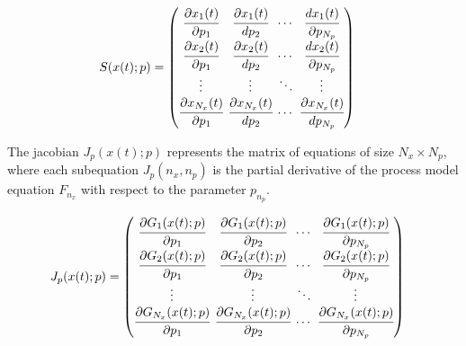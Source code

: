 \documentclass[../Article_Sensitivity_Analsysis.tex]{subfiles}
\begin{document}
	{\footnotesize
		\begin{equation}
			\begin{split}
				{S}({x}(t);{p}) & = 
				\begingroup %
				\setlength\arraycolsep{2pt}
				\begin{pmatrix}
					\cfrac{\partial {x_{1}}(t)}{\partial {p_{1}}} 	& \cfrac{\partial {x_{1}}(t)}{d {p_{2}}}     & \cdots & \cfrac{d {x_{1}}(t)}{\partial {p_{N_p}}}\\
					\cfrac{\partial {x_{2}}(t)}{\partial {p_{1}}} 	& \cfrac{\partial {x_{2}}(t)}{d {p_{2}}}     & \cdots & \cfrac{d {x_{2}}(t)}{\partial {p_{N_p}}}\\
					\vdots					 	    & \vdots 					   	  & \ddots & \vdots\\
					\cfrac{\partial {x_{N_x}}(t)}{\partial {p_{1}}} 	& \cfrac{\partial {x_{N_x}}(t)}{d {p_{2}}}     & \cdots & \cfrac{\partial {x_{N_x}}(t)}{d {p_{N_p}}}
				\end{pmatrix} 
				\endgroup
			\end{split}
	\end{equation} }
	
	The jacobian ${J_p}({x}(t);{p})$ represents the matrix of equations of size $N_x \times N_p$, where each subequation ${J_p}(n_x,n_p)$ is the partial derivative of the process model equation $F_{n_x}$ with respect to the parameter $p_{n_p}$.
	
	{\footnotesize
		\begin{align}
			{J_p}({x}(t);{p}) & =
			\begingroup %
			\setlength\arraycolsep{2pt}
			\begin{pmatrix}
				\cfrac{\partial {G_{1}}({x}(t);{p})}{\partial {p_{1}}} & \cfrac{\partial {G_{1}}({x}(t);{p})}{\partial {p_{2}}} & \cdots & \cfrac{\partial {G_{1}}({x}(t);{p})}{\partial {p_{N_p}}}\\
				\cfrac{\partial {G_{2}}({x}(t);{p})}{\partial {p_{1}}} & \cfrac{\partial {G_{2}}({x}(t);{p})}{\partial {p_{2}}} & \cdots & \cfrac{\partial {G_{2}}({x}(t);{p})}{\partial {p_{N_p}}}\\
				\vdots & \vdots & \ddots & \vdots\\
				\cfrac{\partial {G_{N_x}}({x}(t);{p})}{\partial {p_{1}}} & \cfrac{\partial {G_{N_x}}({x}(t);{p})}{\partial {p_{2}}} & \cdots & \cfrac{\partial {G_{N_x}}({x}(t);{p})}{\partial {p_{N_p}}}
			\end{pmatrix}
			\endgroup
	\end{align}}
	
\end{document}
